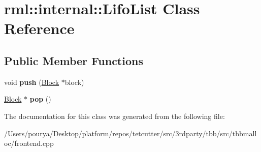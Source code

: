 \hypertarget{classrml_1_1internal_1_1LifoList}{}\section{rml\+:\+:internal\+:\+:Lifo\+List Class Reference}
\label{classrml_1_1internal_1_1LifoList}
\subsection*{Public Member Functions}
\begin{DoxyCompactItemize}
\item 
\hypertarget{classrml_1_1internal_1_1LifoList_aa7629cbd8403ea42d5ec9a5efe9c3f91}{}void {\bfseries push} (\hyperlink{classrml_1_1internal_1_1Block}{Block} $\ast$block)\label{classrml_1_1internal_1_1LifoList_aa7629cbd8403ea42d5ec9a5efe9c3f91}

\item 
\hypertarget{classrml_1_1internal_1_1LifoList_a75a913938955f0898e950401bcdeb54d}{}\hyperlink{classrml_1_1internal_1_1Block}{Block} $\ast$ {\bfseries pop} ()\label{classrml_1_1internal_1_1LifoList_a75a913938955f0898e950401bcdeb54d}

\end{DoxyCompactItemize}


The documentation for this class was generated from the following file\+:\begin{DoxyCompactItemize}
\item 
/\+Users/pourya/\+Desktop/platform/repos/tetcutter/src/3rdparty/tbb/src/tbbmalloc/frontend.\+cpp\end{DoxyCompactItemize}
